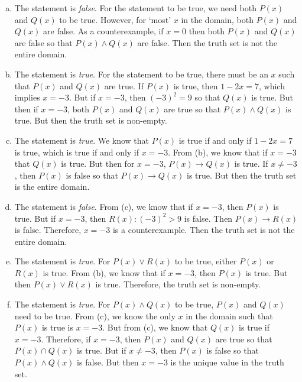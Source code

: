 \documentclass[11pt,letterpaper]{article}
\begin{document}
\sol
\begin{enumerate}[(a)]
\item The statement is \textit{false}. For the statement to be true, we need both $P(x)$ and $Q(x)$ to be true. However, for `most' $x$ in the domain, both $P(x)$ and $Q(x)$ are false. As a counterexample, if $x= 0$ then both $P(x)$ and $Q(x)$ are false so that $P(x) \wedge Q(x)$ are false. Then the truth set is not the entire domain. 
 
\item The statement is \textit{true}. For the statement to be true, there must be an $x$ such that $P(x)$ and $Q(x)$ are true. If $P(x)$ is true, then $1 - 2x= 7$, which implies $x= -3$. But if $x= -3$, then $(-3)^2= 9$ so that $Q(x)$ is true. But then if $x= -3$, both $P(x)$ and $Q(x)$ are true so that $P(x) \wedge Q(x)$ is true. But then the truth set is non-empty. 

\item The statement is \textit{true}. We know that $P(x)$ is true if and only if $1 - 2x= 7$ is true, which is true if and only if $x= -3$. From (b), we know that if $x= -3$ that $Q(x)$ is true. But then for $x= -3$, $P(x) \to Q(x)$ is true. If $x \neq -3$, then $P(x)$ is false so that $P(x) \to Q(x)$ is true. But then the truth set is the entire domain. 

\item The statement is \textit{false}. From (c), we know that if $x= -3$, then $P(x)$ is true. But if $x= -3$, then $R(x) \colon (-3)^2 > 9$ is false. Then $P(x) \to R(x)$ is false. Therefore, $x= -3$ is a counterexample. Then the truth set is not the entire domain. 

\item The statement is \textit{true}. For $P(x) \vee R(x)$ to be true, either $P(x)$ or $R(x)$ is true. From (b), we know that if $x= -3$, then $P(x)$ is true. But then $P(x) \vee R(x)$ is true. Therefore, the truth set is non-empty. 

\item The statement is \textit{true}. For $P(x) \wedge Q(x)$ to be true, $P(x)$ and $Q(x)$ need to be true. From (c), we know the only $x$ in the domain such that $P(x)$ is true is $x= -3$. But from (c), we know that $Q(x)$ is true if $x= -3$. Therefore, if $x= -3$, then $P(x)$ and $Q(x)$ are true so that $P(x) \cap Q(x)$ is true. But if $x \neq -3$, then $P(x)$ is false so that $P(x) \wedge Q(x)$ is false. But then $x= -3$ is the unique value in the truth set. 
\end{enumerate}
\end{document}
